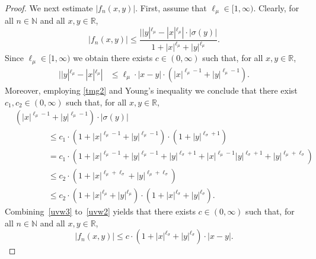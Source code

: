 \documentclass[11pt]{amsart}
\newcommand{\R}{{\mathbb R}}
\newcommand{\N}{{\mathbb N}}
\theoremstyle{plain}
\theoremstyle{definition}
\begin{document}
\begin{proof}
We next estimate $|f_n(x,y)|$. First, assume that $\ell_\mu\in[1, \infty)$.
Clearly, for all $n\in\N$ and all $x,y\in\R$,
\begin{equation}\label{uvw3}
|f_n(x,y)| \le \frac{ ||y|^{\ell_\mu}-|x|^{\ell_\mu}|\cdot |\sigma(y)|}{1+|x|^{\ell_\mu}+|y|^{\ell_\mu}}.
\end{equation}
Since $\ell_\mu\in[1, \infty)$ we obtain there exists $c\in(0, \infty)$ such that, for all $x,y\in\R$,
\begin{equation}\label{uvw1}
	\begin{aligned}
 ||y|^{\ell_\mu}-|x|^{\ell_\mu}|&  \leq \ell_\mu\cdot |x-y|\cdot(|x|^{\ell_\mu-1}+|y|^{\ell_\mu-1}).
\end{aligned}		
\end{equation}
Moreover, employing \eqref{tmg2} and  Young's inequality we conclude that there  exist $c_1, c_2\in(0, \infty)$ such   that, for all $x,y\in\R$,
\begin{equation}\label{uvw2}
	\begin{aligned}
&(|x|^{\ell_\mu-1}+|y|^{\ell_\mu-1})\cdot |\sigma(y)| \\
&\qquad \qquad \leq c_1\cdot (1+|x|^{\ell_\mu-1}+|y|^{\ell_\mu-1})\cdot (1+|y|^{\ell_\sigma+1})\\
&\qquad \qquad=c_1\cdot(1+|x|^{\ell_\mu-1}+|y|^{\ell_\mu-1}+|y|^{\ell_\sigma+1}+|x|^{\ell_\mu-1}|y|^{\ell_\sigma+1}+|y|^{\ell_\mu+\ell_\sigma})\\
&\qquad \qquad\leq c_2\cdot(1+|x|^{\ell_\mu+\ell_\sigma}+|y|^{\ell_\mu+\ell_\sigma})\\
&\qquad \qquad\leq c_2\cdot (1+|x|^{\ell_\mu}+|y|^{\ell_\mu})\cdot (1+|x|^{\ell_\sigma}+|y|^{\ell_\sigma}).
\end{aligned}		
\end{equation}
Combining~\eqref{uvw3} to~\eqref{uvw2} yields that there exists $c\in(0, \infty)$ such that, for all $n\in\N$ and all $x,y\in\R$,
\begin{equation}\label{yl1}
|f_n(x,y)| \le c\cdot (1+|x|^{\ell_\sigma}+|y|^{\ell_\sigma})\cdot |x-y|.
\end{equation}


\end{proof}
\end{document}
